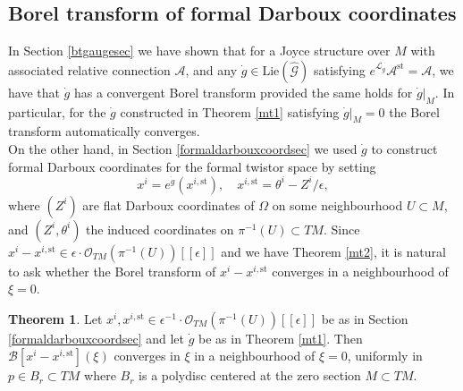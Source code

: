 \documentclass{article}
\theoremstyle{definition}
\newtheorem{theorem}{Theorem}[section]
\numberwithin{equation}{section}
\begin{document}
\subsection{Borel transform of formal Darboux coordinates}

In Section \ref{btgaugesec} we have shown that for a Joyce structure over $M$ with associated relative connection $\mathcal{A}$, and any $\dot{g}\in \text{Lie}(\widehat{\mathcal{G}})$ satisfying $e^{\mathcal{L}_{\dot{g}}}\mathcal{A}^{\text{st}}=\mathcal{A}$, we have that $\dot{g}$ has a convergent Borel transform provided the same holds for $\dot{g}|_M$. In particular, for the $\dot{g}$ constructed in Theorem \ref{mt1} satisfying $\dot{g}|_M=0$ the Borel transform automatically converges. \\

On the other hand, in Section \ref{formaldarbouxcoordsec} we used $\dot{g}$ to construct formal Darboux coordinates for the formal twistor space by setting
\begin{equation*}
    x^i=e^{\dot{g}}(x^{i,\text{st}}), \quad x^{i,\text{st}}=\theta^i-Z^i/\epsilon,
\end{equation*}
where $(Z^i)$ are flat Darboux coordinates of $\Omega$ on some neighbourhood $U\subset M$, and $(Z^i,\theta^i)$ the induced coordinates on $\pi^{-1}(U)\subset TM$. Since $x^i-x^{i,\text{st}}\in \epsilon \cdot  \mathcal{O}_{TM}(\pi^{-1}(U))[[\epsilon]]$ and we have Theorem \ref{mt2}, it is natural to ask whether the Borel transform of $x^i-x^{i,\text{st}}$ converges in a neighbourhood of $\xi=0$.
\begin{theorem}\label{mt3}
    Let $x^i, x^{i,\text{st}}\in \epsilon^{-1}\cdot \mathcal{O}_{TM}(\pi^{-1}(U))[[\epsilon]]$ be as in Section \ref{formaldarbouxcoordsec} and let $\dot{g}$ be as in Theorem \ref{mt1}. Then $\mathcal{B}[x^i-x^{i,\text{st}}](\xi)$ converges in $\xi$ in a neighbourhood of $\xi=0$,  uniformly in $p\in B_r\subset TM$ where $B_r$ is a polydisc centered at the zero section $M\subset TM$.
\end{theorem}
\end{document}
